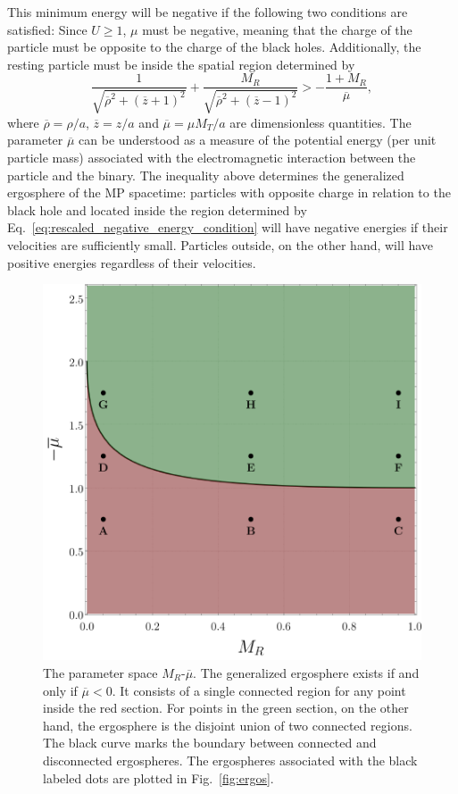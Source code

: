 This minimum energy will be negative if the following two conditions are satisfied: Since $U \ge 1$, $\mu$ must be negative, meaning that the charge of the particle must be opposite to the charge of the black holes. Additionally, the resting particle must be inside the spatial region determined by
\begin{equation} \label{eq:rescaled_negative_energy_condition}
  \frac{1}{\sqrt{\overline{\rho}^2 + (\overline{z}+1)^2}} + \frac{M_R}{\sqrt{\overline{\rho}^2 + (\overline{z}-1)^2}} > - \frac{1+M_R}{\overline{\mu}},
\end{equation}
where $\overline{\rho} = \rho/a$, $\overline{z} = z/a$ and $\overline \mu =  \mu M_T/a$ are dimensionless quantities. The parameter $\overline \mu$ can be understood as a measure of the potential energy (per unit particle mass) associated with the electromagnetic interaction between the particle and the binary.
The inequality above determines the generalized ergosphere of the \ac{MP} spacetime: particles with opposite charge in relation to the black hole and located inside the region determined by Eq.~\eqref{eq:rescaled_negative_energy_condition} will have negative energies if their velocities are sufficiently small. Particles outside, on the other hand, will have positive energies regardless of their velocities.

\begin{figure}[!ht]
  \centering
  \includegraphics[width=\linewidth]{img/penrose_binaries/fig1.pdf}
  \caption{The parameter space $M_R$-$\overline \mu$. The generalized ergosphere exists if and only if $\overline \mu < 0$. It consists of a single connected region for any point inside the red section. For points in the green section, on the other hand, the ergosphere is the disjoint union of two connected regions. The black curve marks the boundary between connected and disconnected ergospheres. The ergospheres associated with the black labeled dots are plotted in Fig.~\ref{fig:ergos}.}
  \label{fig:regions}
\end{figure}


